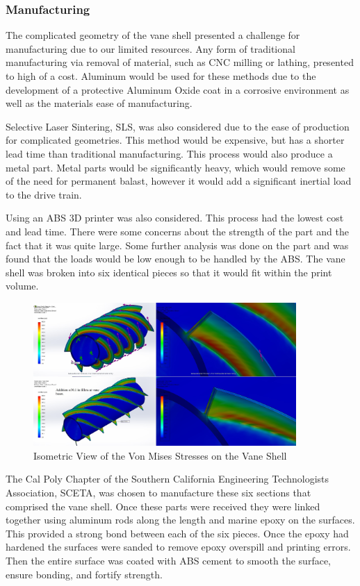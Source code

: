 \documentclass{report}
\begin{document}
\subsubsection{Manufacturing}
The complicated geometry of the vane shell presented a challenge for manufacturing due to our limited resources. Any form of traditional manufacturing via removal of material, such as CNC milling or lathing, presented to high of a cost. Aluminum would be used for these methods due to the development of a protective Aluminum Oxide coat in a corrosive environment as well as the materials ease of manufacturing. \par
Selective Laser Sintering, SLS, was also considered due to the ease of production for complicated geometries. This method would be expensive, but has a shorter lead time than traditional manufacturing. This process would also produce a metal part. Metal parts would be significantly heavy, which would remove some of the need for permanent balast, however it would add a significant inertial load to the drive train.\par
Using an ABS 3D printer was also considered. This process had the lowest cost and lead time. There were some concerns about the strength of the part and the fact that it was quite large. Some further analysis was done on the part and was found that the loads would be low enough to be handled by the ABS. The vane shell was broken into six identical pieces so that it would fit within the print volume. \par
\begin{figure}[H]
\centering
\includegraphics[width=10cm]{"Vane Shell Von Mises Isometric"}
\caption{Isometric View of the Von Mises Stresses on the Vane Shell} 
\end{figure}

The Cal Poly Chapter of the Southern California Engineering Technologists Association, SCETA, was chosen to manufacture these six sections that comprised the vane shell.  Once these parts were received they were linked together using aluminum rods along the length and marine epoxy on the surfaces. This provided a strong bond between each of the six pieces. Once the epoxy had hardened the surfaces were sanded to remove epoxy overspill and printing errors. Then the entire surface was coated with ABS cement to smooth the surface, ensure bonding, and fortify strength.
\end{document}
